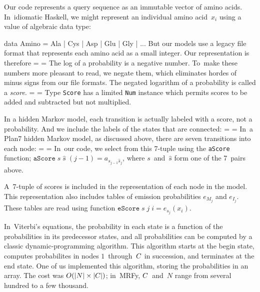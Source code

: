 \documentclass[nonatbib,preprint,blockstyle,times]{sigplanconf}
\newcommand\txprobj[3][]{a#1_{#2_{j-1}#3_j}}
\newcommand\alignwidth{\ensuremath C} %
\newif\ifverbatimsmall
\newenvironment{smallverbatim}{\par\small\verbatimsmalltrue\verbatim}{\endverbatim}
\newcommand\smallverbatiminput[1]{%
  \everypar=\expandafter{\the\everypar
       \verbatimsmallfalse
       \topsep=\standardvspace}%
  \topsep=0.78\topsep
  \verbatimsmalltrue}
\begin{document}
Our code represents a query sequence as an immutable vector of amino
acids.
In~idiomatic Haskell, 
we might represent an individual amino acid~$x_i$
using a value of algebraic data type:
\begin{smallverbatim}
data Amino = Ala | Cys | Asp | Glu | Gly | ...
\end{smallverbatim}
But our models use a
legacy file format that represents each amino acid as a small integer.
Our representation is therefore
\smallverbatiminput{aa}
The log of a probability is a negative number.
To~make these numbers more pleasant to read, we negate them,
which eliminates hordes of minus signs from our file formats.
The negated logarithm of a probability is called a \emph{score}.
\smallverbatiminput{score}
Type \texttt{Score} has a limited \texttt{Num} instance which permits
scores to be added and subtracted but not multiplied.

In a hidden Markov model, each transition is actually labeled with a
score, not a probability.
And we include the labels of the states that are
connected:
\smallverbatiminput{tprob}
In~a Plan7 hidden Markov model, as discussed above, 
there are seven transitions into each node:
\smallverbatiminput{tprobs}
In~our code, we select from this 7-tuple using the \texttt{aScore}
function;
\mbox{$\mathtt{aScore}\;s\;\hat s\;(j-1) = \txprobj s {{\hat s}}$},
where $s$~and~$\hat s$ form one of the 7~pairs above.

A~7-tuple of scores is included in the representation of each node in
the model.
This representation also includes tables of emission probabilities
$e_{M_j}$ and $e_{I_j}$.
These tables are read using function
\mbox{$\mathtt{eScore}\;s\;j\;i = e_{s_j}(x_i)$}.


In~Viterbi's equations,
the probability in each state is a function of the probabilities
in its predecessor states, 
and all probabilities can be computed by a classic dynamic-programming
algorithm.
This algorithm starts at the begin state,
computes probabilites in nodes $1$~through~$\alignwidth$ in
succession, and terminates at the end state.
One of us implemented this algorithm, storing the probabilities in an array.
The cost was
$O(|N|\times|\alignwidth|)$;
in~MRFy, $\alignwidth$~and~$N$ range from several hundred to a few
thousand.
\end{document}
